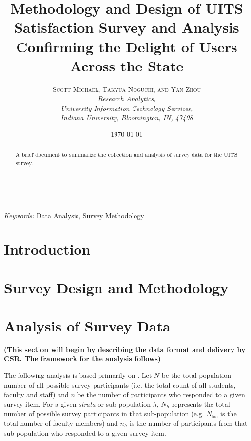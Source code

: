 \documentclass[12pt]{article} %
\title{\textbf{Methodology and Design of UITS Satisfaction Survey and Analysis}\\ %
Confirming the Delight of Users Across the State} %
\author{\textsc{Scott Michael, Takyua Noguchi, and Yan Zhou} %
\\{\textit{Research Analytics,\\
                University Information Technology Services,\\ 
                Indiana University, Bloomington, IN, 47408}}} %
\date{\today} %
\makeatletter
\renewcommand{\maketitle}{ %
\begin{flushright} %
{\LARGE\@title} %

\vspace{50pt} %

{\large\@author} %
\\\@date %

\vspace{40pt} %
\end{flushright}
}
\makeatother
\begin{document}
\maketitle %



\begin{abstract}
A brief document to summarize the collection and analysis of survey data for the UITS survey.
\end{abstract}

\hspace*{3,6mm}\textit{Keywords:} Data Analysis, Survey Methodology %

\vspace{30pt} %


\section*{Introduction}



\section*{Survey Design and Methodology}



\section*{Analysis of Survey Data}

{\bf (This section will begin by describing the data format and delivery by CSR. The framework for the
  analysis follows)}

The following analysis is based primarily on \cite{Levy}. Let $N$ be the total population number of all
possible survey participants (i.e. the total count of all students, faculty and staff) and $n$ be the number
of participants who responded to a given survey item. For a given {\it strata} or sub-population $h$, $N_h$
represents the total number of possible survey participants in that sub-population (e.g. $N_{\mathrm{fac}}$ is
the total number of faculty members) and $n_h$ is the number of participants from that sub-population who
responded to a given survey item. 
\end{document}
